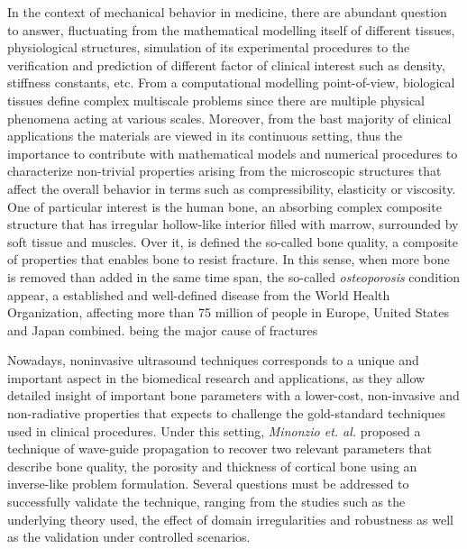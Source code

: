\begin{intro}
In the context of mechanical behavior in medicine, there are abundant question to answer, fluctuating from the mathematical modelling itself of different tissues, physiological structures, simulation of its experimental procedures to the verification and prediction of different factor of clinical interest such as density, stiffness constants, etc. From a computational modelling point-of-view, biological tissues define complex multiscale problems since there are multiple physical phenomena acting at various scales. Moreover, from the bast majority of clinical applications the materials are viewed in its continuous setting, thus the importance to contribute with mathematical models and numerical procedures to characterize non-trivial properties arising from the microscopic structures that affect the overall behavior in terms such as compressibility, elasticity or viscosity.
One of particular interest is the human bone, an absorbing complex composite structure that has irregular hollow-like interior filled with marrow, surrounded by soft tissue and muscles. Over it, is defined the so-called bone quality, a composite of properties that enables bone to resist fracture. In this sense, when more bone is removed than added in the same time span, the so-called \textit{osteoporosis} condition appear, a established and well-defined disease from the World Health Organization, affecting more than 75 million of people in Europe, United States and Japan combined. being the major cause of fractures

Nowadays, noninvasive ultrasound techniques corresponds to a unique and important aspect in the biomedical research and applications, as they allow detailed insight of important bone parameters with a lower-cost, non-invasive and non-radiative properties that expects to challenge the gold-standard techniques used in clinical procedures. Under this setting, \textit{Minonzio et. al.} \cite{Minonzio2018} proposed a technique of wave-guide propagation to recover two relevant parameters that describe bone quality, the porosity and thickness of cortical bone using an inverse-like problem formulation. Several questions must be addressed to successfully validate the technique, ranging from the studies such as the underlying theory used, the effect of domain irregularities and robustness as well as the validation under controlled scenarios.



\end{intro}
